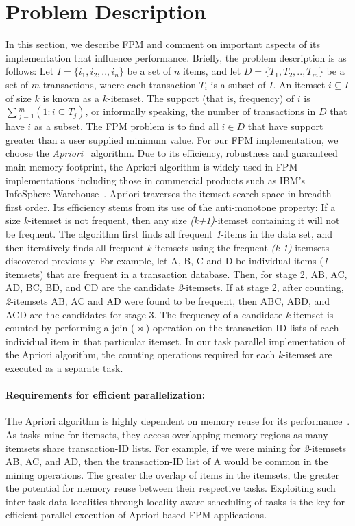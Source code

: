 \documentclass{IOS-Book-Article}
\begin{document}
\section{Problem Description}
\label{sec:problem}
In this section, we describe FPM and comment on important aspects of its
implementation that influence performance.  Briefly, the problem description is
as follows: Let $I=\{i_{1},i_{2},..,i_{n}\}$ be a set of $n$ items, and let
$D=\{T_{1},T_{2},..,T_{m}\}$  be a set of $m$ transactions, where each
transaction $T_{i}$ is a subset of $I$. An itemset $i \subseteq{} I$ of size
$k$ is known as a $k$-itemset. The support (that is, frequency) of $i$ is
$\sum{}_{j=1}^{m} (1:i\subseteq{}T_{j})$, or informally speaking, the number of
transactions in $D$ that have $i$ as a subset. The FPM problem is to find all
$i \in{} D$ that have support greater than a user supplied minimum value.  
For our FPM implementation, we choose the \textit{Apriori}~\cite{
Agrawal:1994:Apriori} algorithm.  Due to its efficiency, robustness and
guaranteed main memory footprint, the Apriori algorithm is widely used in FPM
implementations including those in commercial products such as IBM's InfoSphere
Warehouse~\cite{zaki1999}.   Apriori traverses the itemset search space in
breadth-first order.  Its efficiency stems from its use of the anti-monotone
property: If a size \textit{k}-itemset is not frequent, then any size
\textit{(k+1)}-itemset containing it will not be frequent. The algorithm
first finds all frequent \textit{1}-items in the data set, and then
iteratively finds all frequent \textit{k}-itemsets using the frequent
\textit{(k-1)}-itemsets discovered previously. For example, let A, B, C and D
be individual items (\textit{1}-itemsets) that are frequent in a transaction
database. Then, for stage 2, AB, AC, AD, BC, BD, and CD are the candidate
\textit{2}-itemsets. If at stage 2, after counting, \textit{2}-itemsets AB,
AC and AD were found to be frequent, then ABC, ABD, and ACD are the
candidates for stage 3.  The frequency of a candidate \textit{k}-itemset is
counted by performing a join ($\Join{}$) operation on the transaction-ID
lists of each individual item in that particular itemset. In our task
parallel implementation of the Apriori algorithm, the counting operations
required for each \textit{k}-itemset are executed as a separate task. 

\paragraph{Requirements for efficient parallelization:}
The Apriori algorithm is highly dependent on memory reuse for its
performance~\cite{Ghoting:2007}. As tasks mine for itemsets, they access
overlapping memory regions as many itemsets share transaction-ID lists.  For
example, if we were mining for \textit{2}-itemsets AB, AC, and AD, then the
transaction-ID list of A would be common in the mining operations. The greater
the overlap of items in the itemsets, the greater the potential for memory
reuse between their respective tasks. Exploiting such inter-task data
localities through locality-aware scheduling of tasks is the key for efficient
parallel execution of Apriori-based FPM applications.
\end{document}
